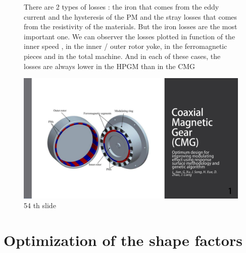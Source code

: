 \begin{figure}[H]
    \begin{minipage}{.45\linewidth}
  There are 2 types of losses : the iron that comes from the eddy current and the hysteresis of the PM and the stray losses that comes from the resistivity of the materials. But the iron losses are the most important one.
  We can observer the losses plotted in function of the inner speed , in the inner / outer rotor yoke, in the ferromagnetic pieces and in the total machine. And in each of these cases, the losses are always lower in the HPGM than in the CMG
    \end{minipage}
    \hfill%
    \begin{minipage}[c]{.45\linewidth}
        \centering
        \includegraphics[page={54},width=\textwidth]{LELEC2311.allow.pdf}
        \caption{54 th slide}
    \end{minipage}
\end{figure}

\section{Optimization of the shape factors}

